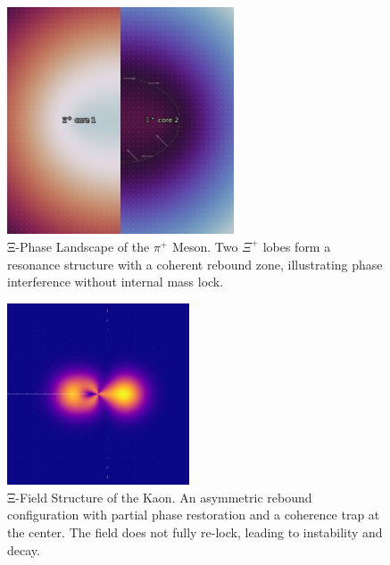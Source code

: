 \begin{figure}[ht]
\centering
\includegraphics[width=0.6\textwidth]{figures/pion_phase_final.png}
\caption{Ξ-Phase Landscape of the $\pi^+$ Meson. Two $\Xi^+$ lobes form a resonance structure with a coherent rebound zone, illustrating phase interference without internal mass lock.}
\label{fig:pion_phase}
\end{figure}

\begin{figure}[ht]
\centering
\includegraphics[width=0.48\textwidth]{figures/xi_kaon_field_overlay.png}
\caption{Ξ-Field Structure of the Kaon. An asymmetric rebound configuration with partial phase restoration and a coherence trap at the center. The field does not fully re-lock, leading to instability and decay.}
\label{fig:kaon_field}
\end{figure}

